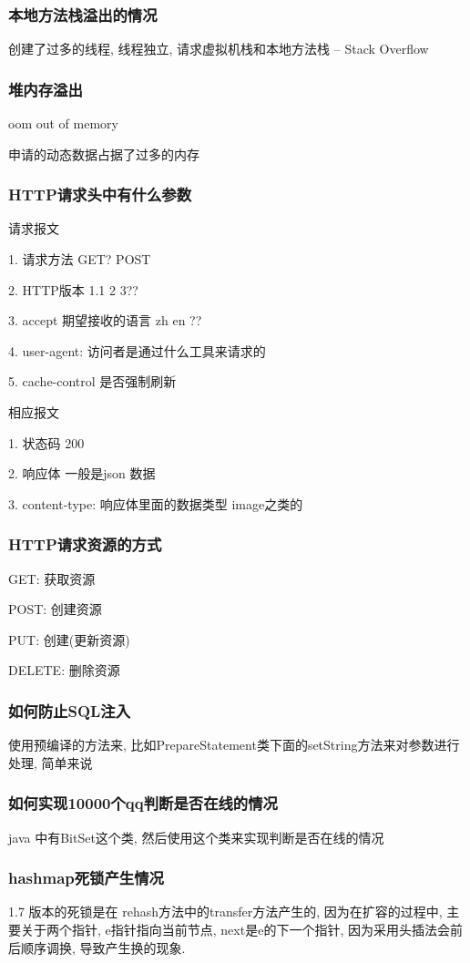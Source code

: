 \documentclass[UTF8]{ctexart}
\begin{document}
\subsubsection{本地方法栈溢出的情况}
创建了过多的线程, 线程独立, 请求虚拟机栈和本地方法栈 -- Stack Overflow

\subsubsection{堆内存溢出}
oom out of memory

申请的动态数据占据了过多的内存


\subsubsection{HTTP请求头中有什么参数}
请求报文


1. 请求方法 GET? POST

2. HTTP版本 1.1 2 3??

3. accept 期望接收的语言 zh en ??

4. user-agent: 访问者是通过什么工具来请求的

5. cache-control 是否强制刷新


相应报文

1. 状态码 200

2. 响应体 一般是json 数据

3. content-type: 响应体里面的数据类型  image之类的
\subsubsection{HTTP请求资源的方式}
GET: 获取资源

POST: 创建资源

PUT: 创建(更新资源)

DELETE: 删除资源
\subsubsection{如何防止SQL注入}
使用预编译的方法来, 比如PrepareStatement类下面的setString方法来对参数进行处理, 简单来说
\subsubsection{如何实现10000个qq判断是否在线的情况}
java 中有BitSet这个类, 然后使用这个类来实现判断是否在线的情况 \par
\subsubsection{hashmap死锁产生情况}
1.7 版本的死锁是在 rehash方法中的transfer方法产生的, 因为在扩容的过程中, 主要关于两个指针, e指针指向当前节点, next是e的下一个指针, 因为采用头插法会前后顺序调换, 导致产生换的现象. \par
\end{document}
